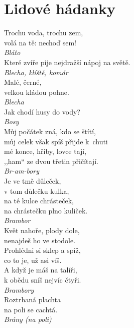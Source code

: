 
\section{Lidové hádanky}
\begin{multicols}{3}

\noindent
Trochu voda, trochu zem,\\
volá na tě: nechoď sem!\\[1 mm]
{\sl Bláto}\\

\noindent
Které zvíře pije nejdražší nápoj na světě.\\[1 mm]
{\sl Blecha, klíště, komár}\\

\noindent
Malé, černé,\\
velkou kládou pohne.\\[1 mm]
{\sl Blecha}\\

\noindent
Jak chodí husy do vody?\\[1 mm]
{\sl Bosy}\\

\noindent
Můj počátek zná, kdo se štítí,\\
můj celek však spíš přijde k~chuti\\
mé konce, hřiby, lovce tají,\\
,,ham`` ze dvou třetin přičítají.\\[1 mm]
{\sl Br-am-bory}\\

\noindent
Je ve tmě důleček,\\
v tom důlečku kulka,\\
na té kulce chrásteček,\\
na chrástečku plno kuliček.\\[1 mm]
{\sl Brambor}\\

\noindent
Květ nahoře, plody dole,\\
nenajdeš ho ve stodole.\\
Prohlédni si sklep a spíž,\\
co to je, už asi víš.\\
A když je máš na talíři,\\
k obědu sníš nejvíc čtyři.\\[1 mm]
{\sl Brambory}\\

\noindent
Roztrhaná plachta\\
na poli se cachtá.\\[1 mm]
{\sl Brány (na poli)}\\


\end{multicols}
